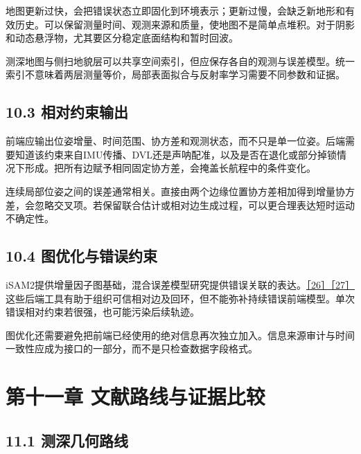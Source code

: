 地图更新过快，会把错误状态立即固化到环境表示；更新过慢，会缺乏新地形和有效历史。可以保留测量时间、观测来源和质量，使地图不是简单点堆积。对于阴影和动态悬浮物，尤其要区分稳定底面结构和暂时回波。

测深地图与侧扫地貌层可以共享空间索引，但应保存各自的观测与误差模型。统一索引不意味着两层测量等价，局部表面拟合与反射率学习需要不同参数和证据。

\hypertarget{ux76f8ux5bf9ux7ea6ux675fux8f93ux51fa}{%
\subsection{10.3 相对约束输出}\label{ux76f8ux5bf9ux7ea6ux675fux8f93ux51fa}}

前端应输出位姿增量、时间范围、协方差和观测状态，而不只是单一位姿。后端需要知道该约束来自IMU传播、DVL还是声呐配准，以及是否在退化或部分掉锁情况下形成。把所有边赋予相同固定协方差，会掩盖长航程中的条件变化。

连续局部位姿之间的误差通常相关。直接由两个边缘位置协方差相加得到增量协方差，会忽略交叉项。若保留联合估计或相对边生成过程，可以更合理表达短时运动不确定性。

\hypertarget{ux56feux4f18ux5316ux4e0eux9519ux8befux7ea6ux675f}{%
\subsection{10.4 图优化与错误约束}\label{ux56feux4f18ux5316ux4e0eux9519ux8befux7ea6ux675f}}

iSAM2提供增量因子图基础，混合误差模型研究提供错误关联的表达。\href{https://www.borg.cc.gatech.edu/papers/kaess12ijrr.html}{［26］}\href{https://april.eecs.umich.edu/media/pdfs/olson2012rss.pdf}{［27］} 这些后端工具有助于组织可信相对边及回环，但不能弥补持续错误前端模型。单次错误相对约束若很强，也可能污染后续轨迹。

图优化还需要避免把前端已经使用的绝对信息再次独立加入。信息来源审计与时间一致性应成为接口的一部分，而不是只检查数据字段格式。

\hypertarget{ux7b2cux5341ux4e00ux7ae0-ux6587ux732eux8defux7ebfux4e0eux8bc1ux636eux6bd4ux8f83}{%
\section{第十一章 文献路线与证据比较}\label{ux7b2cux5341ux4e00ux7ae0-ux6587ux732eux8defux7ebfux4e0eux8bc1ux636eux6bd4ux8f83}}

\hypertarget{ux6d4bux6df1ux51e0ux4f55ux8defux7ebf}{%
\subsection{11.1 测深几何路线}\label{ux6d4bux6df1ux51e0ux4f55ux8defux7ebf}}

